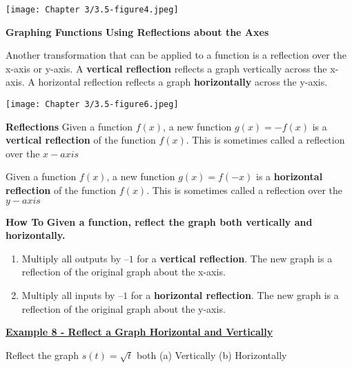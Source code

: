 \documentclass[12pt]{book}
\begin{document}
\centerline{\texttt{[image: Chapter 3/3.5-figure4.jpeg]}}

\newpage
\textbf{Graphing Functions Using Reflections about the Axes}

Another transformation that can be applied to a function is a reflection over the x-axis or y-axis. A \textbf{vertical reflection} reflects a graph vertically across the x-axis. A horizontal reflection reflects a graph \textbf{horizontally} across the y-axis.

\centerline{\texttt{[image: Chapter 3/3.5-figure6.jpeg]}}

\vspace{5mm}

\begin{boxR}
    \textbf{Reflections}
    \vspace{1mm}
    \hline
    \vspace{2mm}
  Given a function $f(x)$, a new function $g(x)=-f(x)$ is a \textbf{vertical reflection} of the function $f(x)$. This is sometimes called a reflection over the $x-axis$

   Given a function $f(x)$, a new function $g(x)=f(-x)$ is a \textbf{horizontal reflection} of the function $f(x)$. This is sometimes called a reflection over the $y-axis$


\end{boxR}

\newpage

\begin{boxR}
    \textbf{How To}
    \vspace{1mm}
    \hline
    \vspace{2mm}
    \textbf{Given a function, reflect the graph both vertically and horizontally.}
    \begin{enumerate}
        \item Multiply all outputs by $–1$ for a \textbf{vertical reflection}. The new graph is a reflection of the original graph about the x-axis.
        \item Multiply all inputs by $–1$ for a \textbf{horizontal reflection}. The new graph is a reflection of the original graph about the y-axis.
    \end{enumerate}
\end{boxR}

\underline{\textbf{Example 8 - Reflect a Graph Horizontal and Vertically}}

Reflect the graph $s(t)= \sqrt{t}$ both \hspace{4mm} (a) Vertically (b) Horizontally
\end{document}
